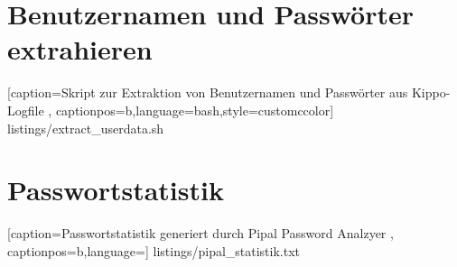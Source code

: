 \section*{Benutzernamen und Passwörter extrahieren}
\label{app:Benutzernamen und Passwörter extrahieren}


    [caption={Skript zur Extraktion von Benutzernamen und Passwörter aus Kippo-Logfile}
       \label{lst:mitm_onmsg},
       captionpos=b,language=bash,style=customccolor]
 {listings/extract_userdata.sh}
 
 
 
 \newpage
 
\section*{Passwortstatistik}
\label{app:Passwortstatistik}


    [caption={Passwortstatistik generiert durch Pipal Password Analzyer}
       \label{lst:mitm_onmsg},
       captionpos=b,language={}]
 {listings/pipal_statistik.txt}
 
 \newpage 
